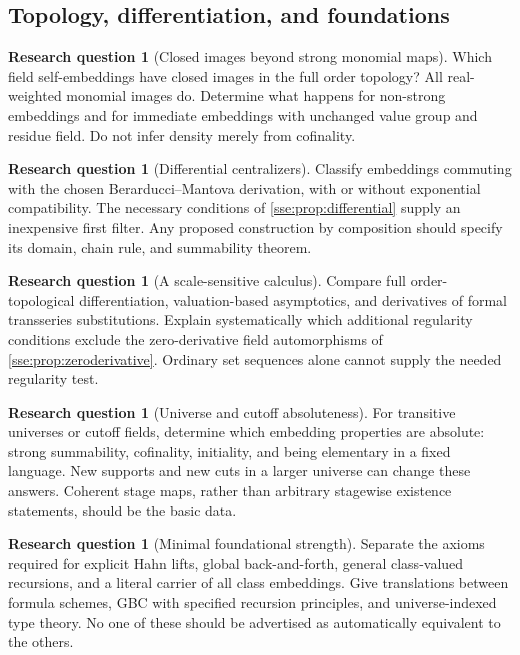 \documentclass[11pt,a4paper]{article}
\numberwithin{equation}{section}
\theoremstyle{plain}
\theoremstyle{definition}
\newtheorem{question}[theorem]{Research question}
\theoremstyle{remark}
\begin{document}
\subsection{Topology, differentiation, and foundations}
\begin{question}[Closed images beyond strong monomial maps]
Which field self-embeddings have closed images in the full order topology?
All real-weighted monomial images do. Determine what happens for
non-strong embeddings and for immediate embeddings with unchanged value
group and residue field. Do not infer density merely from cofinality.
\end{question}

\begin{question}[Differential centralizers]
Classify embeddings commuting with the chosen Berarducci--Mantova
derivation, with or without exponential compatibility. The necessary
conditions of \cref{sse:prop:differential} supply an inexpensive first filter.
Any proposed construction by composition should specify its domain,
chain rule, and summability theorem.
\end{question}

\begin{question}[A scale-sensitive calculus]
Compare full order-topological differentiation, valuation-based
asymptotics, and derivatives of formal transseries substitutions. Explain
systematically which additional regularity conditions exclude the
zero-derivative field automorphisms of \cref{sse:prop:zeroderivative}. Ordinary
set sequences alone cannot supply the needed regularity test.
\end{question}

\begin{question}[Universe and cutoff absoluteness]
For transitive universes or cutoff fields, determine which embedding
properties are absolute: strong summability, cofinality, initiality, and
being elementary in a fixed language. New supports and new cuts in a
larger universe can change these answers. Coherent stage maps, rather
than arbitrary stagewise existence statements, should be the basic data.
\end{question}

\begin{question}[Minimal foundational strength]
Separate the axioms required for explicit Hahn lifts, global
back-and-forth, general class-valued recursions, and a literal carrier of all
class embeddings. Give translations between formula schemes, GBC with
specified recursion principles, and universe-indexed type theory. No one
of these should be advertised as automatically equivalent to the others.
\end{question}
\end{document}

